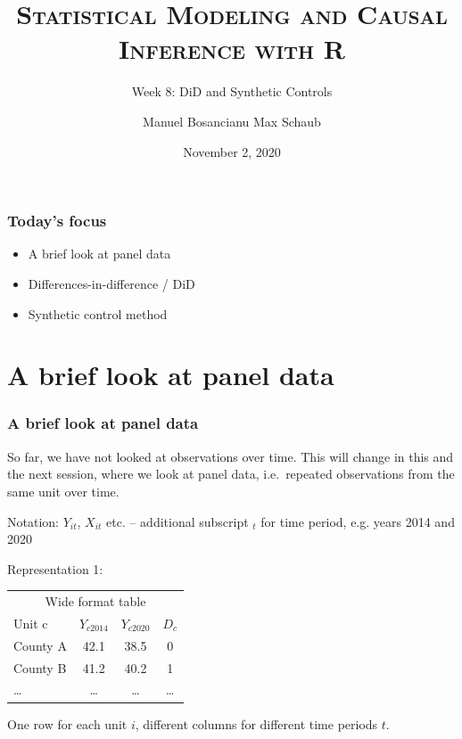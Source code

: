 \documentclass[12pt,english,dvipsnames,aspectratio=169,handout]{beamer}\usepackage[]{graphicx}\usepackage[]{xcolor}
\title{\textsc{Statistical Modeling and Causal Inference with R}}
\subtitle{Week 8: DiD and Synthetic Controls}
\date{November 2, 2020}
\author{Manuel Bosancianu \hfill Max Schaub}
\institute{Hertie School of Governance}
\begin{document}
\maketitle

\begin{frame}
	\frametitle{Today's focus}
	\begin{itemize}
		\item A brief look at panel data
		\item Differences-in-difference / DiD
		\item Synthetic control method
	\end{itemize}
\end{frame}


\section{A brief look at panel data}

\begin{frame}
  \frametitle{A brief look at panel data}
\footnotesize

So far, we have not looked at observations over time. This will change in this and the next session, where we look at panel data, i.e.\ repeated observations from the same unit over time.

Notation: $Y_{it}$, $X_{it}$ etc. -- additional subscript $_t$ for time period, e.g. years 2014 and 2020

Representation 1: 

\scriptsize
\begin{table}\centering
\begin{tabular}{lccc}
\toprule
\multicolumn{4}{c}{Wide format table} \\
Unit c   & $Y_{c2014}$  & $Y_{c2020}$  & $D_c$  \\
\midrule
County A &  42.1     &    38.5   & 0         \\
County B &  41.2     &    40.2    & 1         \\
\ldots  &   \ldots  &  \ldots   & \ldots      \\
\bottomrule
\end{tabular}
\end{table}

One row for each unit $i$, different columns for different time periods $t$.

\end{frame}
\end{document}
